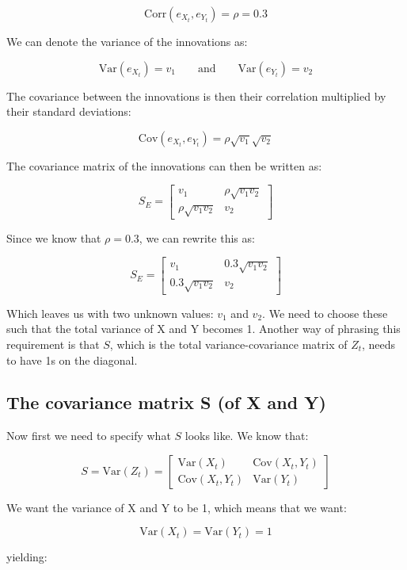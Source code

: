 \documentclass{article}
\begin{document}
\[
\mathrm{Corr}(e_{X_t}, e_{Y_t}) = \rho = 0.3
\]

\noindent
We can denote the variance of the innovations as:

\[
\mathrm{Var}(e_{X_t}) = v_1
\qquad\text{and}\qquad
\mathrm{Var}(e_{Y_t}) = v_2
\]

\noindent
The covariance between the innovations is then their correlation multiplied by their standard deviations:

\[
\mathrm{Cov}(e_{X_t}, e_{Y_t}) = \rho \sqrt{v_1} \sqrt{v_2}
\]

\noindent
The covariance matrix of the innovations can then be written as:

\[
S_E =
\begin{bmatrix}
v_1 & \rho\sqrt{v_1 v_2} \\
\rho\sqrt{v_1 v_2} & v_2
\end{bmatrix}
\]

\noindent 
Since we know that $\rho = 0.3$, we can rewrite this as:

\[
S_E =
\begin{bmatrix}
v_1 & 0.3\sqrt{v_1 v_2} \\
0.3\sqrt{v_1 v_2} & v_2
\end{bmatrix}
\]

\noindent
Which leaves us with two unknown values: $v_1$ and $v_2$. We need to choose these such that the total variance of X and Y becomes 1. 
Another way of phrasing this requirement is that $S$, which is the total variance-covariance matrix of $Z_t$, needs to have 1s on the diagonal.

\newpage

\subsection*{The covariance matrix S (of X and Y)}

\noindent
Now first we need to specify what $S$ looks like. We know that:

\[
S = \mathrm{Var}(Z_t) = 
\begin{bmatrix}
\mathrm{Var}(X_t) & \mathrm{Cov}(X_t, Y_t) \\
\mathrm{Cov}(X_t, Y_t) & \mathrm{Var}(Y_t)
\end{bmatrix}
\]

\noindent
We want the variance of X and Y to be 1, which means that we want:

\[
\mathrm{Var}(X_t) = \mathrm{Var}(Y_t) = 1
\]

yielding:
\end{document}
